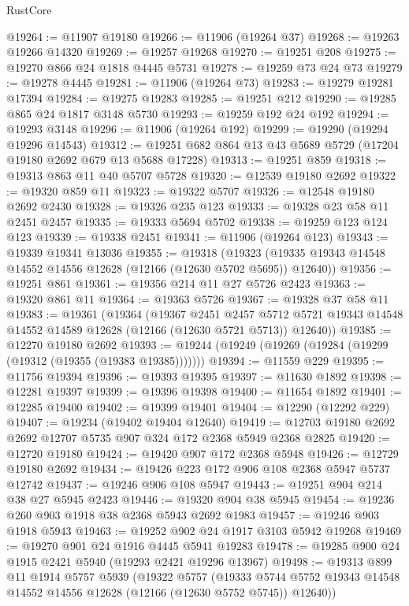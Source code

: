 \begin{lexlean}{RustCore}
\begin{coremodule}
@19264 := @11907 @19180
@19266 := @11906 (@19264 @37)
@19268 := @19263 @19266 @14320
@19269 := @19257 @19268
@19270 := @19251 @208
@19275 := @19270 @866 @24 @1818 @4445 @5731
@19278 := @19259 @73 @24 @73
@19279 := @19278 @4445
@19281 := @11906 (@19264 @73)
@19283 := @19279 @19281 @17394
@19284 := @19275 @19283
@19285 := @19251 @212
@19290 := @19285 @865 @24 @1817 @3148 @5730
@19293 := @19259 @192 @24 @192
@19294 := @19293 @3148
@19296 := @11906 (@19264 @192)
@19299 := @19290 (@19294 @19296 @14543)
@19312 := @19251 @682 @864 @13 @43 @5689 @5729 (@17204 @19180 @2692 @679 @13 @5688 @17228)
@19313 := @19251 @859
@19318 := @19313 @863 @11 @40 @5707 @5728
@19320 := @12539 @19180 @2692
@19322 := @19320 @859 @11
@19323 := @19322 @5707
@19326 := @12548 @19180 @2692 @2430
@19328 := @19326 @235 @123
@19333 := @19328 @23 @58 @11 @2451 @2457
@19335 := @19333 @5694 @5702
@19338 := @19259 @123 @124 @123
@19339 := @19338 @2451
@19341 := @11906 (@19264 @123)
@19343 := @19339 @19341 @13036
@19355 := @19318
    (@19323 (@19335 @19343 @14548 @14552 @14556 @12628 (@12166 (@12630 @5702 @5695)) @12640))
@19356 := @19251 @861
@19361 := @19356 @214 @11 @27 @5726 @2423
@19363 := @19320 @861 @11
@19364 := @19363 @5726
@19367 := @19328 @37 @58 @11
@19383 := @19361
    (@19364
      (@19367
        @2451
        @2457
        @5712
        @5721
        @19343
        @14548
        @14552
        @14589
        @12628
        (@12166 (@12630 @5721 @5713))
        @12640))
@19385 := @12270 @19180 @2692
@19393 := @19244 (@19249 (@19269 (@19284 (@19299 (@19312 (@19355 (@19383 @19385)))))))
@19394 := @11559 @229
@19395 := @11756 @19394
@19396 := @19393 @19395
@19397 := @11630 @1892
@19398 := @12281 @19397
@19399 := @19396 @19398
@19400 := @11654 @1892
@19401 := @12285 @19400
@19402 := @19399 @19401
@19404 := @12290 (@12292 @229)
@19407 := @19234 (@19402 @19404 @12640)
@19419 := @12703 @19180 @2692 @2692 @12707 @5735 @907 @324 @172 @2368 @5949 @2368 @2825
@19420 := @12720 @19180
@19424 := @19420 @907 @172 @2368 @5948
@19426 := @12729 @19180 @2692
@19434 := @19426 @223 @172 @906 @108 @2368 @5947 @5737 @12742
@19437 := @19246 @906 @108 @5947
@19443 := @19251 @904 @214 @38 @27 @5945 @2423
@19446 := @19320 @904 @38 @5945
@19454 := @19236 @260 @903 @1918 @38 @2368 @5943 @2692 @1983
@19457 := @19246 @903 @1918 @5943
@19463 := @19252 @902 @24 @1917 @3103 @5942 @19268
@19469 := @19270 @901 @24 @1916 @4445 @5941 @19283
@19478 := @19285 @900 @24 @1915 @2421 @5940 (@19293 @2421 @19296 @13967)
@19498 := @19313
    @899
    @11
    @1914
    @5757
    @5939
    (@19322
      @5757
      (@19333 @5744 @5752 @19343 @14548 @14552 @14556 @12628 (@12166 (@12630 @5752 @5745)) @12640))

\end{coremodule}
\end{lexlean}
